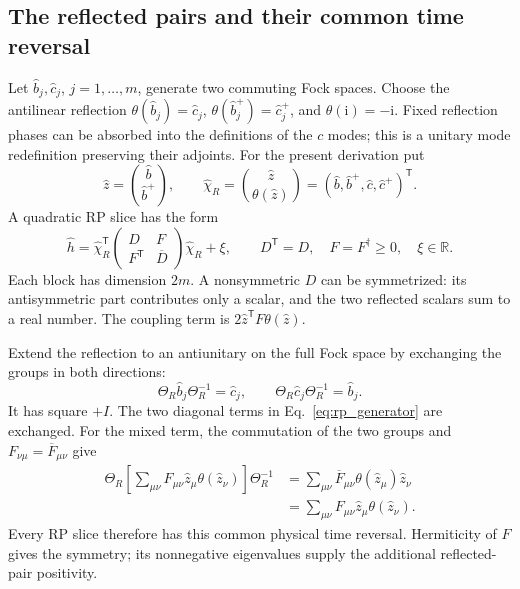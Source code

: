 \documentclass[11pt,a4paper]{article}
\newcommand{\ii}{\mathrm i}
\newcommand{\trans}{\mathsf T}
\numberwithin{equation}{section}
\begin{document}
\subsection{The reflected pairs and their common time reversal}

Let $\hat b_j,\hat c_j$, $j=1,\ldots,m$, generate two commuting Fock
spaces. Choose the antilinear reflection
$\theta(\hat b_j)=\hat c_j$,
$\theta(\hat b_j^+)=\hat c_j^+$, and $\theta(\ii)=-\ii$.
Fixed reflection phases can be absorbed into the definitions of the
$c$ modes; this is a unitary mode redefinition preserving their adjoints.
For the present derivation put
\begin{equation}
 \hat z=\binom{\hat b}{\hat b^+},\qquad
 \hat\chi_R=\binom{\hat z}{\theta(\hat z)}
 =(\hat b,\hat b^+,\hat c,\hat c^+)^\trans.
 \label{eq:rp_basis}
\end{equation}
A quadratic RP slice has the form
\begin{equation}
 \hat h=\hat\chi_R^\trans
 \begin{pmatrix}D&F\\F^\trans&\overline D\end{pmatrix}
 \hat\chi_R+\xi,\qquad
 D^\trans=D,\quad F=F^\dagger\geq0,\quad \xi\in\mathbb R.
 \label{eq:rp_generator}
\end{equation}
Each block has dimension $2m$. A nonsymmetric $D$ can be symmetrized:
its antisymmetric part contributes only a scalar, and the two reflected
scalars sum to a real number. The coupling term is
$2\hat z^\trans F\theta(\hat z)$.

Extend the reflection to an antiunitary on the full Fock space by
exchanging the groups in both directions:
\begin{equation}
 \Theta_R\hat b_j\Theta_R^{-1}=\hat c_j,\qquad
 \Theta_R\hat c_j\Theta_R^{-1}=\hat b_j.
 \label{eq:rp_time_reversal}
\end{equation}
It has square $+I$. The two diagonal terms in
Eq.~\eqref{eq:rp_generator} are exchanged. For the mixed term, the
commutation of the two groups and $F_{\nu\mu}=\overline F_{\mu\nu}$
give
\begin{align}
 \Theta_R\!\left[\sum_{\mu\nu}F_{\mu\nu}
       \hat z_\mu\theta(\hat z_\nu)\right]\Theta_R^{-1}
 &=\sum_{\mu\nu}\overline F_{\mu\nu}
       \theta(\hat z_\mu)\hat z_\nu\nonumber\\
 &=\sum_{\mu\nu}F_{\mu\nu}
       \hat z_\mu\theta(\hat z_\nu).
 \label{eq:rp_reality}
\end{align}
Every RP slice therefore has this common physical time reversal.
Hermiticity of $F$ gives the symmetry; its nonnegative eigenvalues
supply the additional reflected-pair positivity.
\end{document}
